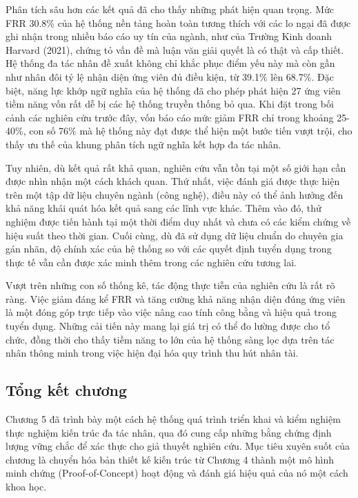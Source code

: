 \documentclass{article}
\begin{document}
\begin{itemize}[topsep=0pt, itemsep=4pt, leftmargin=40pt]
Phân tích sâu hơn các kết quả đã cho thấy những phát hiện quan trọng. Mức FRR 30.8\% của hệ thống nền tảng hoàn toàn tương thích với các lo ngại đã được ghi nhận trong nhiều báo cáo uy tín của ngành, như của Trường Kinh doanh Harvard (2021), chứng tỏ vấn đề mà luận văn giải quyết là có thật và cấp thiết. Hệ thống đa tác nhân đề xuất không chỉ khắc phục điểm yếu này mà còn gần như nhân đôi tỷ lệ nhận diện ứng viên đủ điều kiện, từ 39.1\% lên 68.7\%. Đặc biệt, năng lực khớp ngữ nghĩa của hệ thống đã cho phép phát hiện 27 ứng viên tiềm năng vốn rất dễ bị các hệ thống truyền thống bỏ qua. Khi đặt trong bối cảnh các nghiên cứu trước đây, vốn báo cáo mức giảm FRR chỉ trong khoảng 25-40\%, con số 76\% mà hệ thống này đạt được thể hiện một bước tiến vượt trội, cho thấy ưu thế của khung phân tích ngữ nghĩa kết hợp đa tác nhân.

Tuy nhiên, dù kết quả rất khả quan, nghiên cứu vẫn tồn tại một số giới hạn cần được nhìn nhận một cách khách quan. Thứ nhất, việc đánh giá được thực hiện trên một tập dữ liệu chuyên ngành (công nghệ), điều này có thể ảnh hưởng đến khả năng khái quát hóa kết quả sang các lĩnh vực khác. Thêm vào đó, thử nghiệm được tiến hành tại một thời điểm duy nhất và chưa có các kiểm chứng về hiệu suất theo thời gian. Cuối cùng, dù đã sử dụng dữ liệu chuẩn do chuyên gia gán nhãn, độ chính xác của hệ thống so với các quyết định tuyển dụng trong thực tế vẫn cần được xác minh thêm trong các nghiên cứu tương lai.

Vượt trên những con số thống kê, tác động thực tiễn của nghiên cứu là rất rõ ràng. Việc giảm đáng kể FRR và tăng cường khả năng nhận diện đúng ứng viên là một đóng góp trực tiếp vào việc nâng cao tính công bằng và hiệu quả trong tuyển dụng. Những cải tiến này mang lại giá trị có thể đo lường được cho tổ chức, đồng thời cho thấy tiềm năng to lớn của hệ thống sàng lọc dựa trên tác nhân thông minh trong việc hiện đại hóa quy trình thu hút nhân tài.

\subsection{Tổng kết chương}
Chương 5 đã trình bày một cách hệ thống quá trình triển khai và kiểm nghiệm thực nghiệm kiến trúc đa tác nhân, qua đó cung cấp những bằng chứng định lượng vững chắc để xác thực cho giả thuyết nghiên cứu. Mục tiêu xuyên suốt của chương là chuyển hóa bản thiết kế kiến trúc từ Chương 4 thành một mô hình minh chứng (Proof-of-Concept) hoạt động và đánh giá hiệu quả của nó một cách khoa học.


\end{itemize}
\end{document}
